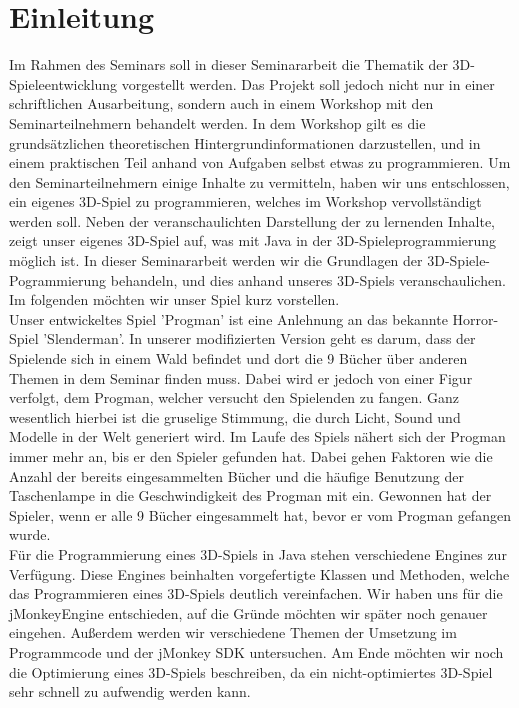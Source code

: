 \chapter{Einleitung}\label{ch:einleitung}
Im Rahmen des Seminars  soll in dieser Seminararbeit die Thematik der 3D-Spieleentwicklung vorgestellt werden. Das Projekt soll jedoch nicht nur in einer schriftlichen Ausarbeitung, sondern auch in einem Workshop mit den Seminarteilnehmern behandelt werden. In dem Workshop gilt es die grundsätzlichen theoretischen Hintergrundinformationen darzustellen, und in einem praktischen Teil anhand von Aufgaben selbst etwas zu programmieren. Um den Seminarteilnehmern einige Inhalte zu vermitteln, haben wir uns entschlossen, ein eigenes 3D-Spiel zu programmieren, welches im Workshop vervollständigt werden soll. Neben der veranschaulichten Darstellung der zu lernenden Inhalte, zeigt unser eigenes 3D-Spiel auf, was mit Java in der 3D-Spieleprogrammierung möglich ist. In dieser Seminararbeit werden wir die Grundlagen der 3D-Spiele- \newline
Pogrammierung behandeln, und dies anhand unseres 3D-Spiels veranschaulichen. Im folgenden möchten wir unser Spiel kurz vorstellen.\\

Unser entwickeltes Spiel 'Progman' ist eine Anlehnung an das bekannte Horror-Spiel 'Slenderman'. In unserer modifizierten Version geht es darum, dass der Spielende sich in einem Wald befindet und dort die 9 Bücher über anderen Themen in dem Seminar finden muss. Dabei wird er jedoch von einer Figur verfolgt, dem Progman, welcher versucht den Spielenden zu fangen. Ganz wesentlich hierbei ist die gruselige Stimmung, die durch Licht, Sound und Modelle in der Welt generiert wird. Im Laufe des Spiels nähert sich der Progman immer mehr an, bis er den Spieler gefunden hat. Dabei gehen Faktoren wie die Anzahl der bereits eingesammelten Bücher und die häufige Benutzung der Taschenlampe in die Geschwindigkeit des Progman mit ein. Gewonnen hat der Spieler, wenn er alle 9 Bücher eingesammelt hat, bevor er vom Progman gefangen wurde. \\

Für die Programmierung eines 3D-Spiels in Java stehen verschiedene Engines zur Verfügung. Diese Engines beinhalten vorgefertigte Klassen und Methoden, welche das Programmieren eines 3D-Spiels deutlich vereinfachen. Wir haben uns für die jMonkeyEngine entschieden, auf die Gründe möchten wir später noch genauer eingehen. Außerdem werden wir verschiedene Themen der Umsetzung im Programmcode und der jMonkey SDK untersuchen. Am Ende möchten wir noch die Optimierung eines 3D-Spiels beschreiben, da ein nicht-optimiertes 3D-Spiel sehr schnell zu aufwendig werden kann.



